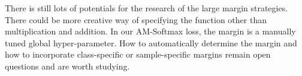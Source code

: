 \documentclass[10pt,twocolumn,letterpaper]{article}
\begin{document}
There is still lots of potentials for the research of the large margin strategies. There could be more creative way of specifying the function  other than multiplication and addition. In our AM-Softmax loss, the margin is a manually tuned global hyper-parameter. How to automatically determine the margin and how to incorporate class-specific or sample-specific margins remain open questions and are worth studying.

{\small


}
\end{document}
